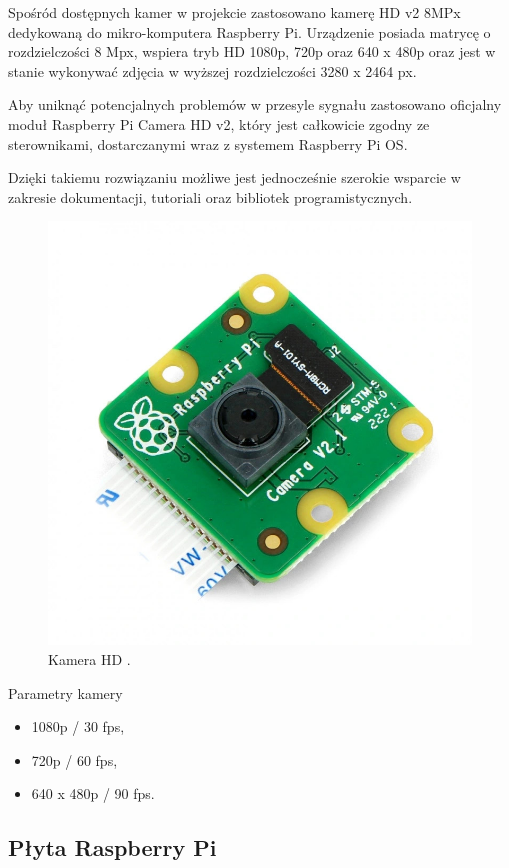 \documentclass[a4paper,12pt,reqno]{article}
\begin{document}
Spośród dostępnych kamer w projekcie zastosowano kamerę  HD v2 8MPx dedykowaną do mikro-komputera Raspberry Pi. Urządzenie posiada matrycę o rozdzielczości 8 Mpx, wspiera tryb HD 1080p, 720p oraz 640 x 480p oraz jest w stanie wykonywać zdjęcia w wyższej rozdzielczości 3280 x 2464 px.

Aby uniknąć potencjalnych problemów w przesyle sygnału zastosowano oficjalny moduł Raspberry Pi Camera HD v2, który jest całkowicie zgodny ze sterownikami, dostarczanymi wraz z systemem Raspberry Pi OS.

Dzięki takiemu rozwiązaniu możliwe jest jednocześnie szerokie wsparcie w zakresie dokumentacji, tutoriali oraz bibliotek programistycznych.

\begin{figure}[H]%
\centering
\includegraphics[width=0.8\columnwidth]{imgs/camera.jpg}
\caption{Kamera HD \cite{img_cam}. \label{kamera}}
\quad
\end{figure}

Parametry kamery

\begin{itemize}
	\item 1080p / 30 fps,
	\item 720p / 60 fps,
	\item 640 x 480p / 90 fps.
\end{itemize}

\subsection{Płyta Raspberry Pi}
\end{document}
